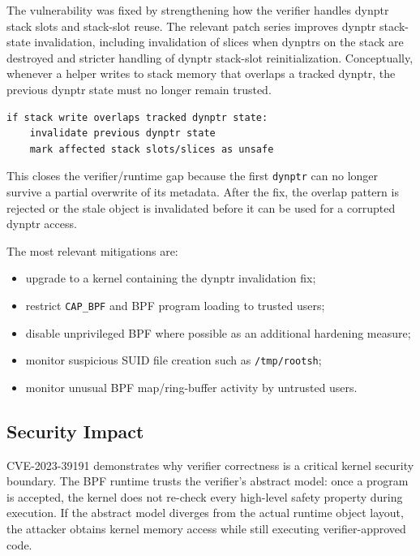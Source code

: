 \documentclass[../main.tex]{subfiles}
\begin{document}
The vulnerability was fixed by strengthening how the verifier handles dynptr stack slots and stack-slot reuse. The relevant patch series improves dynptr stack-state invalidation, including invalidation of slices when dynptrs on the stack are destroyed and stricter handling of dynptr stack-slot reinitialization. Conceptually, whenever a helper writes to stack memory that overlaps a tracked dynptr, the previous dynptr state must no longer remain trusted.

\begin{lstlisting}[caption={Conceptual model of the fix.}]
if stack write overlaps tracked dynptr state:
    invalidate previous dynptr state
    mark affected stack slots/slices as unsafe
\end{lstlisting}

This closes the verifier/runtime gap because the first \texttt{dynptr} can no longer survive a partial overwrite of its metadata. After the fix, the overlap pattern is rejected or the stale object is invalidated before it can be used for a corrupted dynptr access.

The most relevant mitigations are:

\begin{itemize}
    \item upgrade to a kernel containing the dynptr invalidation fix;
    \item restrict \texttt{CAP\_BPF} and BPF program loading to trusted users;
    \item disable unprivileged BPF where possible as an additional hardening measure;
    \item monitor suspicious SUID file creation such as \texttt{/tmp/rootsh};
    \item monitor unusual BPF map/ring-buffer activity by untrusted users.
\end{itemize}

\subsection{Security Impact}

CVE-2023-39191 demonstrates why verifier correctness is a critical kernel security boundary. The BPF runtime trusts the verifier's abstract model: once a program is accepted, the kernel does not re-check every high-level safety property during execution. If the abstract model diverges from the actual runtime object layout, the attacker obtains kernel memory access while still executing verifier-approved code.
\end{document}
